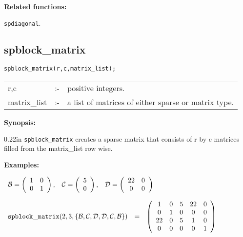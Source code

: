 {\bf Related functions:} 

\hspace*{0.175in} {\tt spdiagonal}.


\subsection{spblock\_matrix}

\hspace*{0.175in} {\tt spblock\_matrix(r,c,matrix\_list);}

\hspace*{0.1in}
\begin{tabular}{l l l}
r,c          &:-& positive integers. \\
matrix\_list &:-& a list of matrices of either sparse or matrix type. 
\end{tabular}

{\bf Synopsis:}

\begin{addtolength}{\leftskip}{0.22in}
{\tt spblock\_matrix} creates a sparse matrix that consists of r by c matrices 
filled from the matrix\_list row wise.

\end{addtolength}


{\bf Examples:}

\begin{flushleft}  
\hspace*{0.1in}
\begin{math}  
\begin{array}{ccc}
{\cal B} = \left( \begin{array}{cc} 1 & 0 \\ 0 & 1
\end{array} \right), & 
{\cal C} = \left( \begin{array}{c} 5 \\ 0
\end{array} \right), &
{\cal D} = \left( \begin{array}{cc} 22 & 0 \\ 0 & 0
\end{array} \right) 
\end{array}
\end{math}  
\end{flushleft}

\vspace*{0.175in}

\begin{flushleft}  
\hspace*{0.1in}
\begin{math}  
\begin{array}{ccc}
{\tt spblock\_matrix}(2,3,\{{\cal B,C,D,D,C,B}\}) & = & 
\left( \begin{array}{ccccc} 1 & 0 & 5 & 22 & 0 \\ 0 & 1 & 0 & 0 & 0 
\\
22 & 0 & 5 & 1 & 0 \\ 0 & 0 & 0 & 0 & 1
\end{array} \right)  
\end{array}  
\end{math}  
\end{flushleft}


